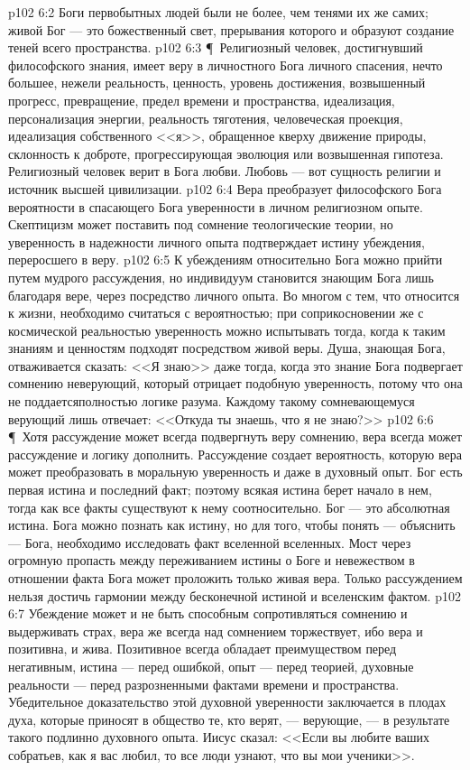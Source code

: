 \vs p102 6:2 Боги первобытных людей были не более, чем тенями их же самих; живой Бог --- это божественный свет, прерывания которого и образуют создание теней всего пространства.
\vs p102 6:3 \P\ Религиозный человек, достигнувший философского знания, имеет веру в личностного Бога личного спасения, нечто большее, нежели реальность, ценность, уровень достижения, возвышенный прогресс, превращение, предел времени и пространства, идеализация, персонализация энергии, реальность тяготения, человеческая проекция, идеализация собственного <<я>>, обращенное кверху движение природы, склонность к доброте, прогрессирующая эволюция или возвышенная гипотеза. Религиозный человек верит в Бога любви. Любовь --- вот сущность религии и источник высшей цивилизации.
\vs p102 6:4 Вера преобразует философского Бога вероятности в спасающего Бога уверенности в личном религиозном опыте. Скептицизм может поставить под сомнение теологические теории, но уверенность в надежности личного опыта подтверждает истину убеждения, переросшего в веру.
\vs p102 6:5 К убеждениям относительно Бога можно прийти путем мудрого рассуждения, но индивидуум становится знающим Бога лишь благодаря вере, через посредство личного опыта. Во многом с тем, что относится к жизни, необходимо считаться с вероятностью; при соприкосновении же с космической реальностью уверенность можно испытывать тогда, когда к таким знаниям и ценностям подходят посредством живой веры. Душа, знающая Бога, отваживается сказать: <<Я знаю>> даже тогда, когда это знание Бога подвергает сомнению неверующий, который отрицает подобную уверенность, потому что она не поддаетсяполностью логике разума. Каждому такому сомневающемуся верующий лишь отвечает: <<Откуда ты знаешь, что я не знаю?>>
\vs p102 6:6 \P\ Хотя рассуждение может всегда подвергнуть веру сомнению, вера всегда может рассуждение и логику дополнить. Рассуждение создает вероятность, которую вера может преобразовать в моральную уверенность и даже в духовный опыт. Бог есть первая истина и последний факт; поэтому всякая истина берет начало в нем, тогда как все факты существуют к нему соотносительно. Бог --- это абсолютная истина. Бога можно познать как истину, но для того, чтобы понять --- объяснить --- Бога, необходимо исследовать факт вселенной вселенных. Мост через огромную пропасть между переживанием истины о Боге и невежеством в отношении факта Бога может проложить только живая вера. Только рассуждением нельзя достичь гармонии между бесконечной истиной и вселенским фактом.
\vs p102 6:7 Убеждение может и не быть способным сопротивляться сомнению и выдерживать страх, вера же всегда над сомнением торжествует, ибо вера и позитивна, и жива. Позитивное всегда обладает преимуществом перед негативным, истина --- перед ошибкой, опыт --- перед теорией, духовные реальности --- перед разрозненными фактами времени и пространства. Убедительное доказательство этой духовной уверенности заключается в плодах духа, которые приносят в общество те, кто верят, --- верующие, --- в результате такого подлинно духовного опыта. Иисус сказал: <<Если вы любите ваших собратьев, как я вас любил, то все люди узнают, что вы мои ученики>>.
